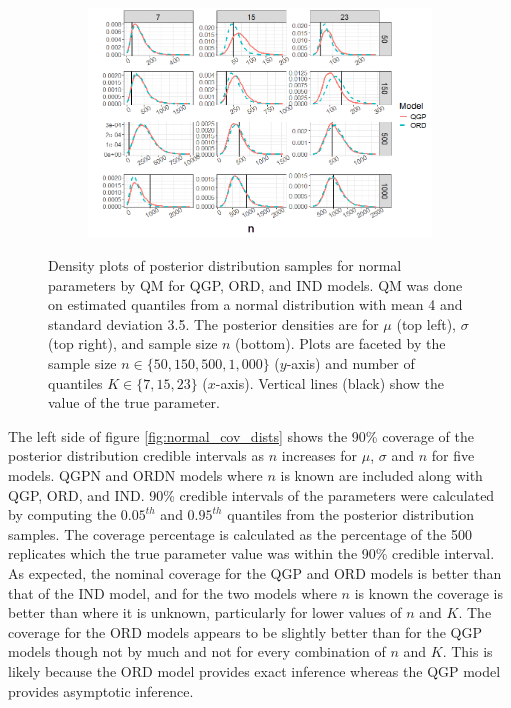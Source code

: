 \documentclass[preprint,12pt,authoryear]{elsarticle}
\begin{document}
\begin{figure}[ht!]
\medskip %
\begin{subfigure}{.53\linewidth}
  \includegraphics[width=\linewidth]{Images/normal_n_fit.png}
\end{subfigure}\hfill %
\tiny
\caption{Density plots of posterior distribution samples for normal parameters by QM for QGP, ORD, and IND models. QM was done on estimated quantiles from a normal distribution with mean 4 and standard deviation 3.5. The posterior densities are for $\mu$ (top left), $\sigma$ (top right), and sample size $n$ (bottom). Plots are faceted by the sample size $n \in \{50, 150, 500, 1{,}000\}$ ($y$-axis) and number of quantiles $K \in \{7, 15, 23\}$ ($x$-axis). Vertical lines (black) show the value of the true parameter.}
\label{fig:normal_densities}
\end{figure}


The left side of figure \ref{fig:normal_cov_dists} shows the 90\% coverage of the posterior distribution credible intervals as $n$ increases for $\mu$, $\sigma$ and $n$ for five models. QGPN and ORDN models where $n$ is known are included along with QGP, ORD, and IND. 90\% credible intervals of the parameters were calculated by computing the $0.05^{th}$ and $0.95^{th}$ quantiles from the posterior distribution samples. The coverage percentage is calculated as the percentage of the 500 replicates which the true parameter value was within the 90\% credible interval.
As expected, the nominal coverage for the QGP and ORD models is better than that of the IND model, and for the two models where $n$ is known the coverage is better than where it is unknown, particularly for lower values of $n$ and $K$. The coverage for the ORD models appears to be slightly better than for the QGP models though not by much and not for every combination of $n$ and $K$. This is likely because the ORD model provides exact inference whereas the QGP model provides asymptotic inference.
\end{document}
